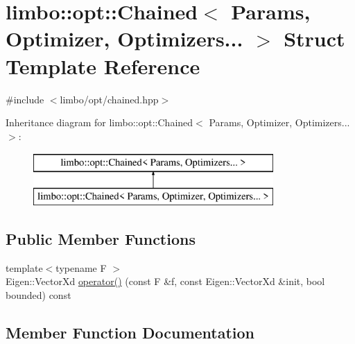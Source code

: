 \hypertarget{structlimbo_1_1opt_1_1_chained_3_01_params_00_01_optimizer_00_01_optimizers_8_8_8_01_4}{}\section{limbo\+:\+:opt\+:\+:Chained$<$ Params, Optimizer, Optimizers... $>$ Struct Template Reference}
\label{structlimbo_1_1opt_1_1_chained_3_01_params_00_01_optimizer_00_01_optimizers_8_8_8_01_4}


{\ttfamily \#include $<$limbo/opt/chained.\+hpp$>$}

Inheritance diagram for limbo\+:\+:opt\+:\+:Chained$<$ Params, Optimizer, Optimizers... $>$\+:\begin{figure}[H]
\begin{center}
\leavevmode
\includegraphics[height=2.000000cm]{structlimbo_1_1opt_1_1_chained_3_01_params_00_01_optimizer_00_01_optimizers_8_8_8_01_4}
\end{center}
\end{figure}
\subsection*{Public Member Functions}
\begin{DoxyCompactItemize}
\item 
{\footnotesize template$<$typename F $>$ }\\Eigen\+::\+Vector\+Xd \hyperlink{structlimbo_1_1opt_1_1_chained_3_01_params_00_01_optimizer_00_01_optimizers_8_8_8_01_4_a8c19fbe75f61232764a03cf5b530ccbd}{operator()} (const F \&f, const Eigen\+::\+Vector\+Xd \&init, bool bounded) const 
\end{DoxyCompactItemize}


\subsection{Member Function Documentation}
